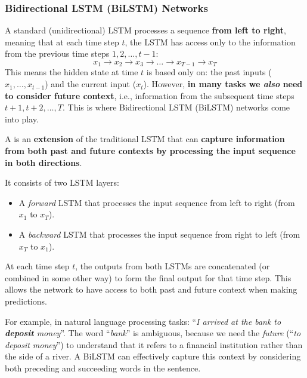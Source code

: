 \subsubsection{Bidirectional LSTM (BiLSTM) Networks}\label{sec:bidirectional-lstm-networks}

A standard (unidirectional) LSTM processes a sequence \textbf{from left to right}, meaning that at each time step \(t\), the LSTM has access only to the information from the previous time steps \(1, 2, \ldots, t-1\):
\begin{equation*}
    x_1 \rightarrow x_2 \rightarrow x_3 \rightarrow \ldots \rightarrow x_{T-1} \rightarrow x_T
\end{equation*}
This means the hidden state at time $t$ is based only on: the past inputs ($x_1, \dots, x_{t-1}$) and the current input ($x_t$). However, \textbf{in many tasks we \emph{also} need to consider future context}, i.e., information from the subsequent time steps \(t+1, t+2, \ldots, T\). This is where Bidirectional LSTM (BiLSTM) networks come into play.

\highspace
\begin{definitionbox}
    A  is an \textbf{extension} of the traditional LSTM that can \textbf{capture information from both past and future contexts by processing the input sequence in both directions}.

    It consists of two LSTM layers:
    \begin{itemize}
        \item A \emph{forward} LSTM that processes the input sequence from left to right (from \(x_1\) to \(x_T\)).
        \item A \emph{backward} LSTM that processes the input sequence from right to left (from \(x_T\) to \(x_1\)).
    \end{itemize}
    At each time step \(t\), the outputs from both LSTMs are concatenated (or combined in some other way) to form the final output for that time step. This allows the network to have access to both past and future context when making predictions.
\end{definitionbox}

\highspace
\begin{examplebox}
    For example, in natural language processing tasks: ``\emph{I arrived at the bank to \textbf{deposit} money}''. The word ``\emph{bank}'' is ambiguous, because we need the \emph{future} (``\emph{to deposit money}'') to understand that it refers to a financial institution rather than the side of a river. A BiLSTM can effectively capture this context by considering both preceding and succeeding words in the sentence.
\end{examplebox}

